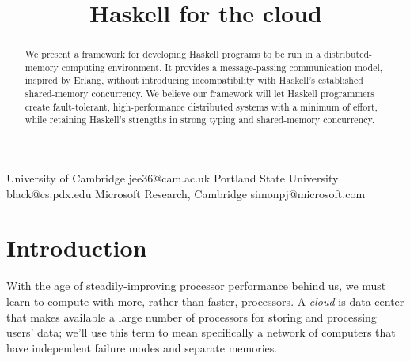 \documentclass[preprint]{sigplanconf}
\begin{document}
\title{Haskell for the cloud}
\subtitle{}

           {University of Cambridge}
           {jee36@cam.ac.uk}
           {Portland State University}
           {black@cs.pdx.edu}
           {Microsoft Research, Cambridge}
           {simonpj@microsoft.com}

\maketitle

\begin{abstract}
We present a framework for developing Haskell programs to be run in a distributed-memory computing environment. It provides a message-passing communication model, inspired by Erlang, without introducing incompatibility with Haskell's established shared-memory concurrency. We believe our framework will let Haskell programmers create fault-tolerant, high-performance distributed systems with a minimum of effort, while retaining Haskell's strengths in strong typing and shared-memory concurrency.

\end{abstract}


%
%
%
%
\section{Introduction}

With the age of steadily-improving processor performance behind us, we must learn to compute with more, rather than faster, processors. 
A \emph{cloud} is data center that makes available a large number of processors for storing and processing users' data; we'll use this term to mean specifically a network of computers that have independent failure modes and separate memories.
\end{document}
